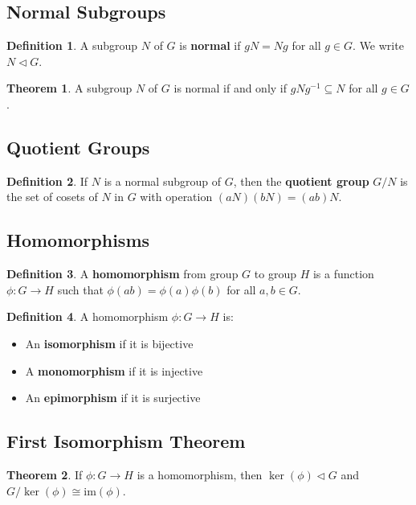 \documentclass[11pt]{article}
\theoremstyle{definition}
\newtheorem{definition}{Definition}[section]
\newtheorem{theorem}{Theorem}[section]
\begin{document}
\subsection{Normal Subgroups}
\begin{definition}
A subgroup $N$ of $G$ is \textbf{normal} if $gN = Ng$ for all $g \in G$. We write $N \triangleleft G$.
\end{definition}

\begin{theorem}
A subgroup $N$ of $G$ is normal if and only if $gNg^{-1} \subseteq N$ for all $g \in G$.
\end{theorem}

\subsection{Quotient Groups}
\begin{definition}
If $N$ is a normal subgroup of $G$, then the \textbf{quotient group} $G/N$ is the set of cosets of $N$ in $G$ with operation $(aN)(bN) = (ab)N$.
\end{definition}

\subsection{Homomorphisms}
\begin{definition}
A \textbf{homomorphism} from group $G$ to group $H$ is a function $\phi: G \to H$ such that $\phi(ab) = \phi(a)\phi(b)$ for all $a, b \in G$.
\end{definition}

\begin{definition}
A homomorphism $\phi: G \to H$ is:
\begin{itemize}
    \item An \textbf{isomorphism} if it is bijective
    \item A \textbf{monomorphism} if it is injective
    \item An \textbf{epimorphism} if it is surjective
\end{itemize}
\end{definition}

\subsection{First Isomorphism Theorem}
\begin{theorem}
If $\phi: G \to H$ is a homomorphism, then $\ker(\phi) \triangleleft G$ and $G/\ker(\phi) \cong \text{im}(\phi)$.
\end{theorem}
\end{document}
